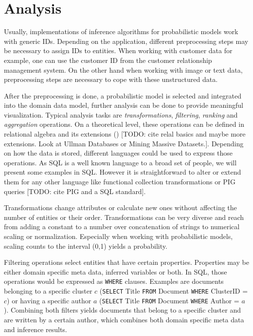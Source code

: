 \section{Analysis}

Usually, implementations of inference algorithms for probabilistic models work with generic IDs. Depending on the application, different preprocessing steps may be necessary to assign IDs to entities. When working with customer data for example, one can use the customer ID from the customer relationship management system. On the other hand when working with image or text data, preprocessing steps are necessary to cope with these unstructured data.

After the preprocessing is done, a probabilistic model is selected and integrated into the domain data model, further analysis can be done to provide meaningful visualization. Typical analysis tasks are \emph{transformations}, \emph{filtering}, \emph{ranking} and \emph{aggregation} operations. On a theoretical level, these operations can be defined in relational algebra and its extensions (\cite{ozsoyouglu1987extending, klug1982equivalence}) [TODO: cite relal basics and maybe more extensions. Look at Ullman Databases or Mining Massive Datasets.]. Depending on how the data is stored, different languages could be used to express those operations. As SQL is a well known language to a broad set of people, we will present some examples in SQL. However it is straightforward to alter or extend them for any other language like functional collection transformations or PIG queries [TODO: cite PIG and a SQL standard].

Transformations change attributes or calculate new ones without affecting the number of entities or their order. Transformations can be very diverse and reach from adding a constant to a number over concatenation of strings to numerical scaling or normalization. Especially when working with probabilistic models, scaling counts to the interval (0,1) yields a probability.

Filtering operations select entities that have certain properties. Properties may be either domain specific meta data, inferred variables or both. In SQL, those operations would be expressed as \texttt{WHERE} clauses. Examples are documents belonging to a specific cluster $c$ (\texttt{SELECT} Title \texttt{FROM} Document \texttt{WHERE} ClusterID = $c$) or having a specific author $a$ (\texttt{SELECT} Title \texttt{FROM} Document \texttt{WHERE} Author = $a$). Combining both filters yields documents that belong to a specific cluster and are written by a certain author, which combines both domain specific meta data and inference results.

